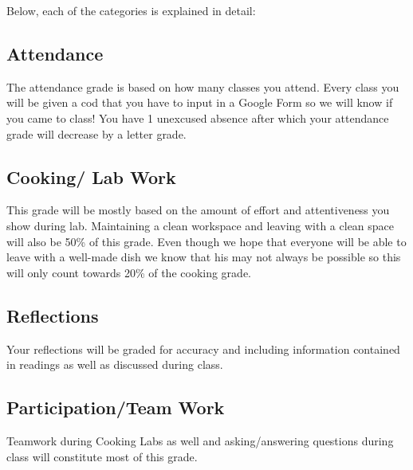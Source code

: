 \documentclass{article}
\begin{document}
Below, each of the categories is explained in detail:
\subsection{Attendance}
 The attendance grade is based on how many classes you attend. Every class you will be given a cod that you have to input in a Google Form so we will know if you came to class! You have 1 unexcused absence after which  your attendance grade will decrease by a letter grade.

\subsection{Cooking/ Lab Work} This grade will be mostly based on the amount of effort and attentiveness you show during lab. Maintaining a clean workspace and leaving with a clean space will also be 50\% of this grade. Even though we hope that everyone will be able to leave with a well-made dish we know that his may not always be possible so this will only count towards 20\% of the cooking grade.

\subsection{Reflections} Your reflections will be graded for accuracy and including information contained in readings as well as discussed during class.

\subsection{Participation/Team Work} Teamwork during Cooking Labs as well and asking/answering questions during class will constitute most of this grade.
\end{document}
